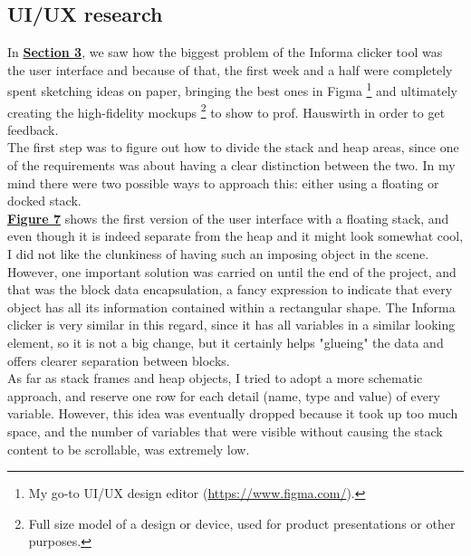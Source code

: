 \documentclass[]{usiinfbachelorproject}
\begin{document}
\subsection{UI/UX research} \label{ui-ux research}

In \hyperref[requirements+analysis]{\textbf{Section 3}}, we saw how the biggest problem of the Informa clicker tool was the user interface and because of that, the first week and a half were completely spent sketching ideas on paper, bringing the best ones in Figma \footnote{My go-to UI/UX design editor (\url{https://www.figma.com/}).} and ultimately creating the high-fidelity mockups \footnote{Full size model of a design or device, used for product presentations or other purposes.} to show to prof. Hauswirth in order to get feedback.\\
The first step was to figure out how to divide the stack and heap areas, since one of the requirements was about having a clear distinction between the two. In my mind there were two possible ways to approach this: either using a floating or docked stack.\\

\noindent \hyperref[floating stack]{\textbf{Figure 7}} shows the first version of the user interface with a floating stack, and even though it is indeed separate from the heap and it might look somewhat cool, I did not like the clunkiness of having such an imposing object in the scene. However, one important solution was carried on until the end of the project, and that was the block data encapsulation, a fancy expression to indicate that every object has all its information contained within a rectangular shape. The Informa clicker is very similar in this regard, since it has all variables in a similar looking element, so it is not a big change, but it certainly helps "glueing" the data and offers clearer separation between blocks.\\
As far as stack frames and heap objects, I tried to adopt a more schematic approach, and reserve one row for each detail (name, type and value) of every variable. However, this idea was eventually dropped because it took up too much space, and the number of variables that were visible without causing the stack content to be scrollable, was extremely low. 
\end{document}

